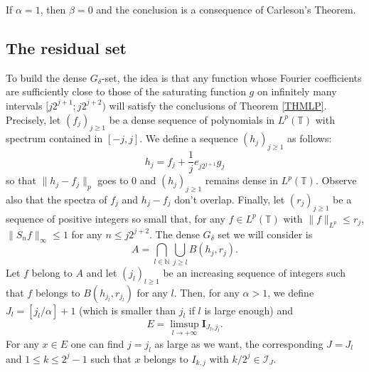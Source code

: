 \documentclass[11pt,a4paper]{amsart}
\theoremstyle{plain}
\begin{document}
\begin{remark}
If $\alpha=1$, then $\beta=0$ and the conclusion is a
consequence of Carleson's Theorem.
\end{remark}

\subsection{The residual set}
To build the dense $G_\delta$-set, the idea is that any function whose Fourier
coefficients are sufficiently
close to those of the saturating function $g$ on infinitely many intervals $[j2^{j+1};j2^{j+2})$ will 
satisfy the conclusions of Theorem \ref{THMLP}. Precisely,
let $(f_j)_{j\ge 1}$ be a dense sequence of polynomials in $L^p({\mathbb T})$ with
spectrum contained in $[-j,j]$.
 We define a sequence $(h_j)_{j\ge 1}$ as follows:
$$h_j=f_j+\frac{1}{j}e_{j2^{j+1}}g_j$$
so that $\|h_j-f_j\|_p$ goes to 0 and $(h_j)_{j\ge 1}$ remains dense in
$L^p({\mathbb T})$. Observe also that the spectra of $f_j$ and $h_j-f_j$ don't
overlap. Finally, let $(r_j)_{j\ge 1}$ be a
sequence of positive integers so small that, for any $f\in L^p({\mathbb T})$
with $\|f\|_{L^p}\leq r_j$, $\|S_n f\|_\infty\leq 1$ for any $n\le j2^{j+2}$. 
The dense $G_\delta$ set we will consider is
$$A=\bigcap_{l\in\mathbb N}\bigcup_{j\geq l}B(h_j,r_j).$$
Let $f$ belong to $A$ and let $(j_l)_{l\ge 1}$ be an increasing sequence of integers such that $f$ belongs to $B(h_{j_l},r_{j_l})$ for any $l$. Then,
for any $\alpha> 1$, we define $J_l=[j_l/\alpha]+1$ (which is smaller than
$j_l$ if $l$ is large enough) and 
$$E=\limsup_{l \to+\infty} \mathbf I_{J_l,j_l}.$$
For any $x\in E$ one can find $j=j_l$ as large as we want, the
corresponding $J=J_l$ and $1\leq k\leq 2^j-1$ such that $x$ belongs to $I_{k,j}$
with $k/2^j\in \mathcal I_{J}$. 
\end{document}
